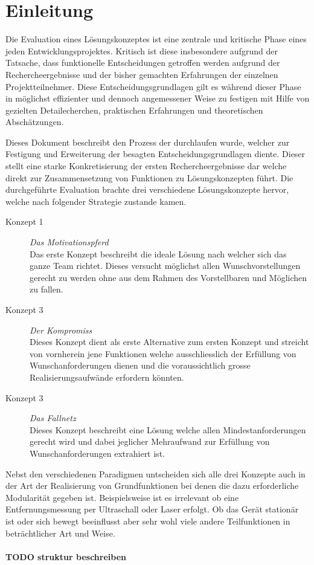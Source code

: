\section{Einleitung}

Die Evaluation eines Lösungskonzeptes ist eine zentrale und kritische Phase
eines jeden Entwicklungsprojektes. Kritisch ist diese insbesondere aufgrund 
der Tatsache, dass funktionelle Entscheidungen getroffen werden aufgrund der
Rechercheergebnisse und der bisher gemachten Erfahrungen der einzelnen 
Projektteilnehmer. Diese Entscheidungsgrundlagen gilt es während dieser Phase
in möglichst effizienter und dennoch angemessener Weise zu festigen mit Hilfe
von gezielten Detailecherchen, praktischen Erfahrungen und theoretischen
Abschätzungen.

Dieses Dokument beschreibt den Prozess der durchlaufen wurde, welcher zur 
Festigung und Erweiterung der besagten Entscheidungsgrundlagen diente. Dieser
stellt eine starke Konkretisierung der ersten Rechercheergebnisse dar welche
direkt zur Zusammensetzung von Funktionen zu Lösungskonzepten führt. Die 
durchgeführte Evaluation brachte drei verschiedene Lösungskonzepte
hervor, welche nach folgender Strategie zustande kamen.

\begin{description}
	\item[Konzept 1] \emph{Das Motivationspferd} \\
		Das erste Konzept beschreibt die ideale Lösung nach welcher
		sich das ganze Team richtet. Dieses versucht möglichst allen
		Wunschvorstellungen gerecht zu werden ohne aus dem Rahmen
		des Vorstellbaren und Möglichen zu fallen.
	\item[Konzept 3] \emph{Der Kompromiss} \\
		Dieses Konzept dient als erste Alternative zum ersten Konzept
		und streicht von vornherein jene Funktionen welche 
		ausschliesslich der Erfüllung von Wunschanforderungen dienen
		und die voraussichtlich grosse Realisierungsaufwände 
		erfordern könnten.
	\item[Konzept 3] \emph{Das Fallnetz} \\
		Dieses Konzept beschreibt eine Lösung welche allen 
		Mindestanforderungen gerecht wird und dabei jeglicher 
		Mehraufwand zur Erfüllung von Wunschanforderungen
		extrahiert ist.
\end{description}

Nebst den verschiedenen Paradigmen untscheiden sich alle drei Konzepte
auch in der Art der Realisierung von Grundfunktionen bei denen die dazu
erforderliche Modularität gegeben ist. Beispielsweise ist es irrelevant
ob eine Entfernungsmessung per Ultraschall oder Laser erfolgt. Ob das
Gerät stationär ist oder sich bewegt beeinflusst aber sehr wohl viele 
andere Teilfunktionen in beträchtlicher Art und Weise.\\\\
\textbf{TODO struktur beschreiben}
